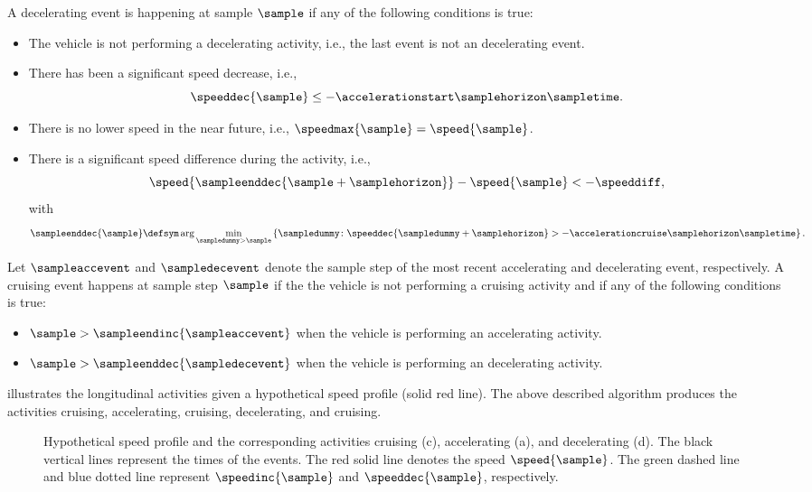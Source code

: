 A decelerating event is happening at sample $\sample$ if any of the following conditions is true:
\begin{itemize}
	\item The vehicle is not performing a decelerating activity, i.e., the last event is not an decelerating event.
	\item \cstarta There has been a significant speed decrease, i.e., 
	\begin{equation}
		\label{eq:start deceleration}
		\speeddec{\sample} \leq -\accelerationstart\samplehorizon\sampletime.
	\end{equation} \cenda
	\item There is no lower speed in the near future, i.e., $\speedmax{\sample}=\speed{\sample}$.
	\item There is a significant speed difference during the activity, i.e., 
	\begin{equation}
		\speed{\sampleenddec{\sample+\samplehorizon}} - \speed{\sample} < -\speeddiff,
	\end{equation}
	with
	\begin{equation}
		\label{eq:end deceleration}
		\sampleenddec{\sample} \defsym \arg \min_{\sampledummy > \sample} \left\{ \sampledummy\colon \speeddec{\sampledummy+\samplehorizon} > -\accelerationcruise\samplehorizon\sampletime \right\}.
	\end{equation}
\end{itemize}

Let $\sampleaccevent$ and $\sampledecevent$ denote the sample step of the most recent accelerating and decelerating event, respectively. A cruising event happens at sample step $\sample$ if the the vehicle is not performing a cruising activity and if any of the following conditions is true:
\begin{itemize}
	\item $\sample > \sampleendinc{\sampleaccevent}$ when the vehicle is performing an accelerating activity.
	\item $\sample > \sampleenddec{\sampledecevent}$ when the vehicle is performing an decelerating activity.
\end{itemize}

\cstarta%
 illustrates the longitudinal activities given a hypothetical speed profile (solid red line). The above described algorithm produces the activities cruising, accelerating, cruising, decelerating, and cruising.
\cenda

\setlength{\figurewidth}{\linewidth}
\setlength{\figureheight}{0.7\linewidth}
\begin{figure}
	\centering
	
	\caption{\cstarta Hypothetical speed profile and the corresponding activities cruising (c), accelerating (a), and decelerating (d). The black vertical lines represent the times of the events. The red solid line denotes the speed $\speed{\sample}$. The green dashed line and blue dotted line represent $\speedinc{\sample}$ and $\speeddec{\sample}$, respectively.\cenda}
	\label{fig:longitudinal activities}
\end{figure}

